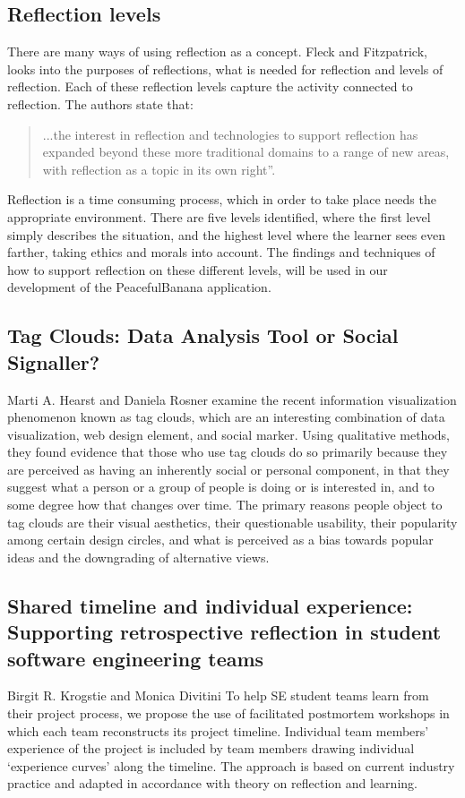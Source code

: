 \subsection*{Reflection levels}
There are many ways of using reflection as a concept. Fleck and Fitzpatrick\cite{Fleck2010}, looks into the purposes of reflections, what is needed for reflection and levels of reflection. Each of these reflection levels capture the activity connected to reflection. The authors state that: 
\begin{quotation}
...the interest in reflection and technologies to support reflection has expanded beyond these more traditional domains to a range of new areas, with reflection as a topic in its own right”. 
\end{quotation}
Reflection is a time consuming process, which in order to take place needs the appropriate environment. There are five levels identified, where the first level simply describes the situation, and the highest level where the learner sees even farther, taking ethics and morals into account. The findings and techniques of how to support reflection on these different levels\cite{Fleck2010}, will be used in our development of the PeacefulBanana application. 

\subsection{Tag Clouds: Data Analysis Tool or Social Signaller?}\cite{Hearst2008}
Marti A. Hearst and Daniela Rosner examine the recent information visualization phenomenon known as tag clouds, which are an interesting combination of data visualization, web design element, and social marker. Using qualitative methods, they found evidence that those who use tag clouds do so primarily because they are perceived as having an inherently social or personal component, in that they suggest what a person or a group of people is doing or is interested in, and to some degree how that changes over time. The primary reasons people object to tag clouds are their visual aesthetics, their questionable usability, their popularity among certain design circles, and what is perceived as a bias towards popular ideas and the downgrading of alternative views.

\subsection{Shared timeline and individual experience: Supporting retrospective reflection in student software engineering teams}\cite{Krogstie2009}
Birgit R. Krogstie and Monica Divitini To help SE student teams learn from their project process, we propose the use of facilitated postmortem workshops in which each team reconstructs its project timeline. Individual team members’ experience of the project is included by team members drawing individual ‘experience curves’ along the timeline. The approach is based on current industry practice and adapted in accordance with theory on reflection and learning.

